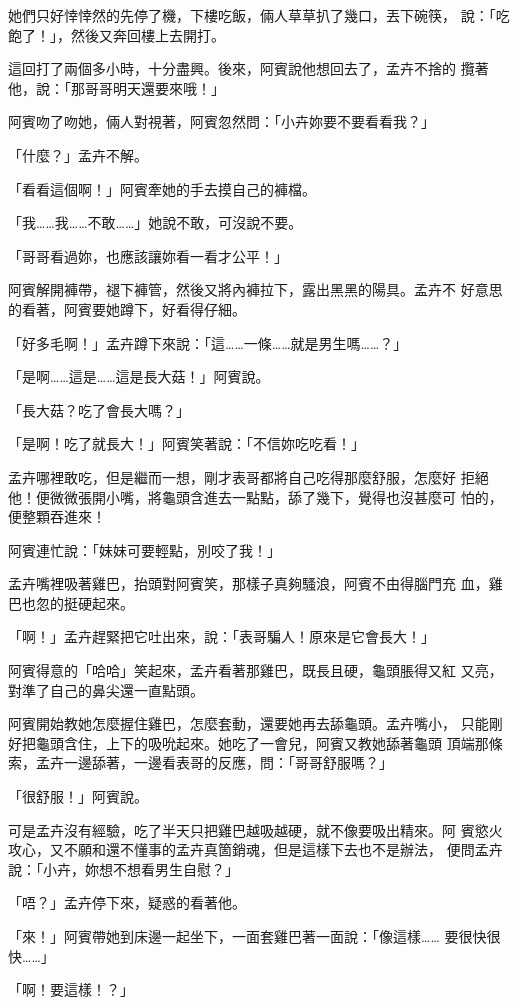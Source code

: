 她們只好悻悻然的先停了機，下樓吃飯，倆人草草扒了幾口，丟下碗筷，
說：「吃飽了！」，然後又奔回樓上去開打。

這回打了兩個多小時，十分盡興。後來，阿賓說他想回去了，孟卉不捨的
攬著他，說：「那哥哥明天還要來哦！」

阿賓吻了吻她，倆人對視著，阿賓忽然問：「小卉妳要不要看看我？」

「什麼？」孟卉不解。

「看看這個啊！」阿賓牽她的手去摸自己的褲檔。

「我……我……不敢……」她說不敢，可沒說不要。

「哥哥看過妳，也應該讓妳看一看才公平！」

阿賓解開褲帶，褪下褲管，然後又將內褲拉下，露出黑黑的陽具。孟卉不
好意思的看著，阿賓要她蹲下，好看得仔細。

「好多毛啊！」孟卉蹲下來說：「這……一條……就是男生嗎……？」

「是啊……這是……這是長大菇！」阿賓說。

「長大菇？吃了會長大嗎？」

「是啊！吃了就長大！」阿賓笑著說：「不信妳吃吃看！」

孟卉哪裡敢吃，但是繼而一想，剛才表哥都將自己吃得那麼舒服，怎麼好
拒絕他！便微微張開小嘴，將龜頭含進去一點點，舔了幾下，覺得也沒甚麼可
怕的，便整顆吞進來！

阿賓連忙說：「妹妹可要輕點，別咬了我！」

孟卉嘴裡吸著雞巴，抬頭對阿賓笑，那樣子真夠騷浪，阿賓不由得腦門充
血，雞巴也忽的挺硬起來。

「啊！」孟卉趕緊把它吐出來，說：「表哥騙人！原來是它會長大！」

阿賓得意的「哈哈」笑起來，孟卉看著那雞巴，既長且硬，龜頭脹得又紅
又亮，對準了自己的鼻尖還一直點頭。

阿賓開始教她怎麼握住雞巴，怎麼套動，還要她再去舔龜頭。孟卉嘴小，
只能剛好把龜頭含住，上下的吸吮起來。她吃了一會兒，阿賓又教她舔著龜頭
頂端那條索，孟卉一邊舔著，一邊看表哥的反應，問：「哥哥舒服嗎？」

「很舒服！」阿賓說。

可是孟卉沒有經驗，吃了半天只把雞巴越吸越硬，就不像要吸出精來。阿
賓慾火攻心，又不願和還不懂事的孟卉真箇銷魂，但是這樣下去也不是辦法，
便問孟卉說：「小卉，妳想不想看男生自慰？」

「唔？」孟卉停下來，疑惑的看著他。

「來！」阿賓帶她到床邊一起坐下，一面套雞巴著一面說：「像這樣……
要很快很快……」

「啊！要這樣！？」

